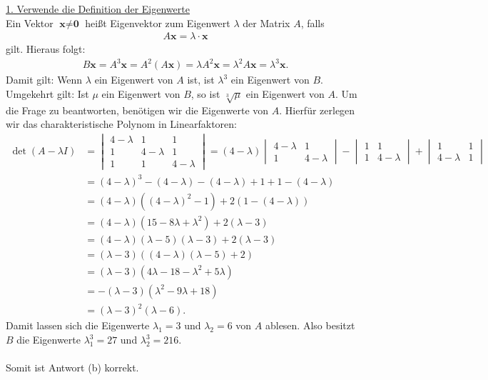 \underline{1. Verwende die Definition der Eigenwerte}\\
Ein Vektor $ \textbf{x} \neq \textbf{0} $ heißt Eigenvektor zum Eigenwert $ \lambda $ der Matrix $ A $, falls
\begin{align*}
	A \textbf{x} = \lambda \cdot \textbf{x} 
\end{align*}
gilt. Hieraus folgt:
\begin{align*}
	B \textbf{x} = A^3  \textbf{x}
	= A^2 ( A \textbf{x} ) 
	= \lambda A^2 \textbf{x}
	= \lambda^2 A \textbf{x}
	= \lambda^3\textbf{x}.
\end{align*}
Damit gilt: Wenn $ \lambda $ ein Eigenwert von $ A $ ist, ist $ \lambda^3 $ ein Eigenwert von $ B $.
Umgekehrt gilt: Ist $ \mu $ ein Eigenwert von $ B $, so ist $ \sqrt[3]{\mu} $ ein Eigenwert von $ A $.
Um die Frage zu beantworten, benötigen wir die Eigenwerte von $ A $. Hierfür zerlegen wir das charakteristische Polynom in Linearfaktoren:
\begin{align*}
	\det(A - \lambda I)
	&=
	\begin{vmatrix}
		4- \lambda & 1 & 1 \\
		1 & 4- \lambda & 1\\
		1 & 1 & 4 - \lambda
	\end{vmatrix}
=
	(4 - \lambda) 
	\begin{vmatrix}
		4- \lambda & 1\\
		 1 & 4 - \lambda
	\end{vmatrix}
	-
	\begin{vmatrix}
		1 & 1\\
		1 & 4 - \lambda
	\end{vmatrix}
	+
	\begin{vmatrix}
		1 & 1\\
		4 - \lambda &  1
	\end{vmatrix}\\
	&=
	(4-\lambda)^3 - (4- \lambda)
	-(4-\lambda) + 1 
	+1 - (4-\lambda )\\
	&=
	(4-\lambda)( (4-\lambda)^2 - 1) + 2 ( 1 - (4- \lambda))\\
	&=
	(4 - \lambda)(15 - 8 \lambda + \lambda^2) + 2 (\lambda -3)\\
	&=
	(4 - \lambda)(\lambda - 5)(\lambda - 3) + 2 ( \lambda -3)\\
	&=
	(\lambda - 3) 
	\left(
	(4 - \lambda)(\lambda - 5) +2
	\right)\\
	&=
	(\lambda - 3) 
	\left(
	4 \lambda - 18 - \lambda^2 + 5 \lambda
	\right)\\
	&=
	-(\lambda - 3) 
	\left(
	\lambda^2 - 9 \lambda + 18
	\right)\\
	&=
	(\lambda-3)^2(\lambda-6).
\end{align*}
Damit lassen sich die  Eigenwerte $ \lambda_1 = 3 $ und $ \lambda_2 = 6 $ von $ A $ ablesen.
Also besitzt $ B $ die Eigenwerte $ \lambda_1^3 = 27 $ und $ \lambda_2^3 = 216 $.\\
\\
Somit ist Antwort (b) korrekt.

